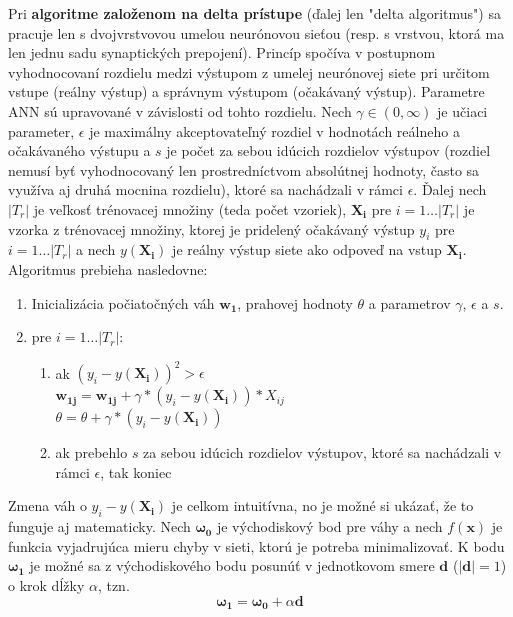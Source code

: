 Pri \textbf{algoritme založenom na delta prístupe} (ďalej len "delta algoritmus") sa pracuje len s dvojvrstvovou
umelou neurónovou sieťou (resp. s vrstvou, ktorá ma len jednu sadu synaptických prepojení).
Princíp spočíva v postupnom vyhodnocovaní rozdielu medzi výstupom z umelej neurónovej siete pri určitom vstupe
(reálny výstup) a správnym výstupom (očakávaný výstup).
Parametre ANN sú upravované v závislosti od tohto rozdielu.
Nech $\gamma \in (0, \infty)$ je učiaci parameter, $\epsilon$ je maximálny akceptovateľný rozdiel v hodnotách reálneho
a očakávaného výstupu a $s$ je počet za sebou idúcich rozdielov výstupov (rozdiel nemusí byť vyhodnocovaný len
prostredníctvom absolútnej hodnoty, často sa využíva aj druhá mocnina rozdielu), ktoré sa nachádzali v rámci $\epsilon$.
Ďalej nech $|T_r|$ je veľkosť trénovacej množiny (teda počet vzoriek), $\mathbf{X_i}$ pre $i=1 \dots |T_r|$ je vzorka
z trénovacej množiny, ktorej je pridelený očakávaný výstup $y_i$ pre $i=1 \dots |T_r|$ a nech $y(\mathbf{X_i})$ je reálny
výstup siete ako odpoveď na vstup $\mathbf{X_i}$.
Algoritmus prebieha nasledovne:
\begin{enumerate}
    \item Inicializácia počiatočných váh $\pmb{w_1}$, prahovej hodnoty $\theta$ a parametrov $\gamma$, $\epsilon$ a $s$.
    \item pre $i = 1 \dots |T_r|$:
    \begin{enumerate}
        \item ak $(y_i-y(\mathbf{X_i}))^2>\epsilon$ \\
                $\pmb{w_{1j}}=\pmb{w_{1j}} + \gamma * (y_i-y(\mathbf{X_i})) * X_{ij}$ \\
                $\theta=\theta + \gamma * (y_i-y(\mathbf{X_i}))$
        \item ak prebehlo $s$ za sebou idúcich rozdielov výstupov, ktoré sa nachádzali v rámci $\epsilon$, tak koniec
    \end{enumerate}
\end{enumerate}
Zmena váh o $y_i-y(\mathbf{X_i})$ je celkom intuitívna, no je možné si ukázať, že to funguje aj matematicky.
Nech $\pmb{\omega_0}$ je východiskový bod pre váhy a nech $f(\pmb{x})$ je funkcia vyjadrujúca mieru chyby v sieti,
ktorú je potreba minimalizovať.
K bodu $\pmb{\omega_1}$ je možné sa z východiskového bodu posunúť v jednotkovom smere $\pmb{d}$ ($|\pmb{d}|=1$) o krok
dĺžky $\alpha$, tzn.
\begin{equation}
    \pmb{\omega_1} = \pmb{\omega_0} + \alpha\pmb{d}
\end{equation}

